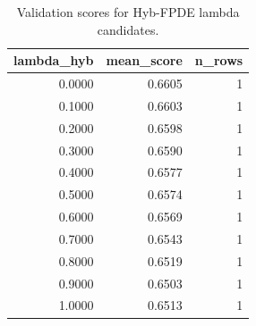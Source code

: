 \begin{table}[t]
\caption{Validation scores for Hyb-FPDE lambda candidates.}
\label{tab:lambda_distribution_computed}
\centering
\begin{tabular}{rrr}
\toprule
lambda\_hyb & mean\_score & n\_rows \\
\midrule
0.0000 & 0.6605 & 1 \\
0.1000 & 0.6603 & 1 \\
0.2000 & 0.6598 & 1 \\
0.3000 & 0.6590 & 1 \\
0.4000 & 0.6577 & 1 \\
0.5000 & 0.6574 & 1 \\
0.6000 & 0.6569 & 1 \\
0.7000 & 0.6543 & 1 \\
0.8000 & 0.6519 & 1 \\
0.9000 & 0.6503 & 1 \\
1.0000 & 0.6513 & 1 \\
\bottomrule
\end{tabular}

\end{table}
